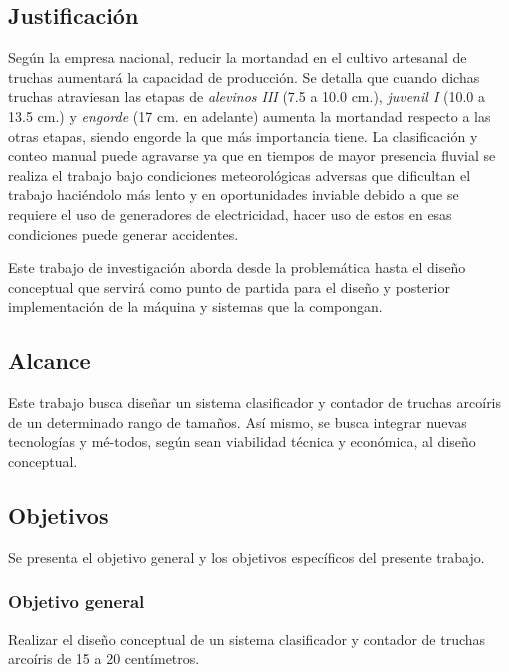 \subsection{Justificación}

Según la empresa nacional, reducir la mortandad en el cultivo artesanal de truchas aumentará la capacidad de producción. Se detalla que cuando dichas truchas atraviesan las etapas de \textit{alevinos III} (7.5 a 10.0 cm.), \textit{juvenil I} (10.0 a 13.5 cm.) y \textit{engorde} (17 cm. en adelante) aumenta la mortandad respecto a las otras etapas, siendo engorde la que más importancia tiene. La clasificación y conteo manual puede agravarse ya que en tiempos de mayor presencia fluvial se realiza el trabajo bajo condiciones meteorológicas adversas que dificultan el trabajo haciéndolo más lento y en oportunidades inviable debido a que se requiere el uso de generadores de electricidad, hacer uso de estos en esas condiciones puede generar accidentes. 

Este trabajo de investigación aborda desde la problemática hasta el diseño conceptual que servirá como punto de partida para el diseño y posterior implementación de la máquina y sistemas que la compongan.

\subsection{Alcance}

Este trabajo busca diseñar un sistema clasificador y contador de truchas arcoíris de un determinado rango de tamaños. Así mismo, se busca integrar nuevas tecnologías y mé-todos, según sean viabilidad técnica y económica, al diseño conceptual.

\subsection{Objetivos}

Se presenta el objetivo general y los objetivos específicos del presente trabajo.

\subsubsection{Objetivo general}

Realizar el diseño conceptual de un sistema clasificador y contador de truchas arcoíris de 15 a 20 centímetros.

